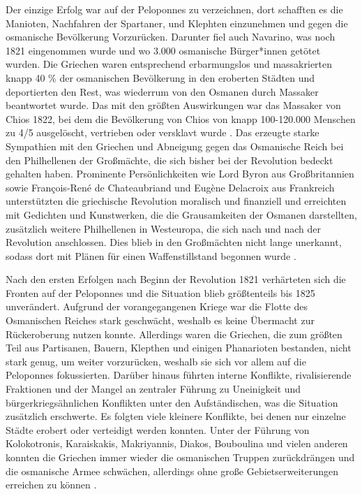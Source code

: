 \documentclass[preprint]{geomorphica} %
\begin{document}
Der einzige Erfolg war auf der Peloponnes zu verzeichnen, dort schafften es die Manioten, Nachfahren der Spartaner, und Klephten einzunehmen und gegen die osmanische Bevölkerung Vorzurücken.
Darunter fiel auch Navarino, was noch 1821 eingenommen wurde und wo 3.000 osmanische Bürger*innen getötet wurden.
Die Griechen waren entsprechend erbarmungslos und massakrierten knapp 40 \% der osmanischen Bevölkerung in den eroberten Städten und deportierten den Rest, was wiederrum von den Osmanen durch Massaker beantwortet wurde.
Das mit den größten Auswirkungen war das Massaker von Chios 1822, bei dem die Bevölkerung von Chios von knapp 100-120.000 Menschen zu 4/5 ausgelöscht, vertrieben oder versklavt wurde \cite{Brewer2001}.
Das erzeugte starke Sympathien mit den Griechen und Abneigung gegen das Osmanische Reich bei den Philhellenen der Großmächte, die sich bisher bei der Revolution bedeckt gehalten haben.
Prominente Persönlichkeiten wie Lord Byron aus Großbritannien sowie François-René de Chateaubriand und Eugène Delacroix aus Frankreich unterstützten die griechische Revolution moralisch und finanziell und erreichten mit Gedichten und Kunstwerken, die die Grausamkeiten der Osmanen darstellten, zusätzlich weitere Philhellenen in Westeuropa, die sich nach und nach der Revolution anschlossen.
Dies blieb in den Großmächten nicht lange unerkannt, sodass dort mit Plänen für einen Waffenstillstand begonnen wurde \cite{Brewer2001, Dakin1973, Clogg1979, Konstantinou2012, Clair2008, Forster1958}.

Nach den ersten Erfolgen nach Beginn der Revolution 1821 verhärteten sich die Fronten auf der Peloponnes und die Situation blieb größtenteils bis 1825 unverändert.
Aufgrund der vorangegangenen Kriege war die Flotte des Osmanischen Reiches stark geschwächt, weshalb es keine Übermacht zur Rückeroberung nutzen konnte.
Allerdings waren die Griechen, die zum größten Teil aus Partisanen, Bauern, Klepthen und einigen Phanarioten bestanden, nicht stark genug, um weiter vorzurücken, weshalb sie sich vor allem auf die Peloponnes fokussierten.
Darüber hinaus führten interne Konflikte, rivalisierende Fraktionen und der Mangel an zentraler Führung zu Uneinigkeit und bürgerkriegsähnlichen Konflikten unter den Aufständischen, was die Situation zusätzlich erschwerte.
Es folgten viele kleinere Konflikte, bei denen nur einzelne Städte erobert oder verteidigt werden konnten.
Unter der Führung von Kolokotronis, Karaiskakis, Makriyannis, Diakos, Bouboulina und vielen anderen konnten die Griechen immer wieder die osmanischen Truppen zurückdrängen und die osmanische Armee schwächen, allerdings ohne große Gebietserweiterungen erreichen zu können \cite{Zelepos2015, Brewer2001, Clair2008}.
\end{document}

